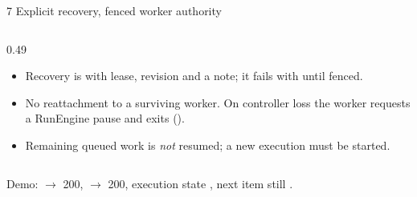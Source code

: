 \begin{frame}{7 \quad Explicit recovery, fenced worker authority}
\begin{columns}[T]
\begin{column}{0.49\textwidth}
\begin{block}{\vtwo{}}
\begin{itemize}
                    \item Recovery is  with lease, revision and a note;
                          it fails with  until fenced.
                    \item No reattachment to a surviving worker. On controller loss the worker requests a
                          RunEngine pause and exits (). 
                    \item Remaining queued work is \emph{not} resumed; a new execution must be started.
                \end{itemize}
            \end{block}
        \end{column}
    \end{columns}
    \vspace{0.1cm}
    {\footnotesize\color{qsgray} Demo:  $\rightarrow$ 200,  $\rightarrow$ 200,
    execution state , next item still .\par}
\end{frame}

